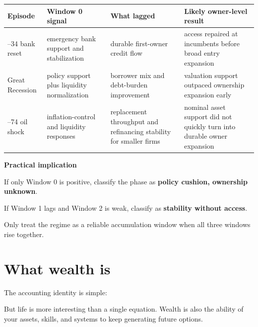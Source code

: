 \documentclass[11pt,openany]{book}
\begin{document}
\begin{center}
\small
\begin{tabularx}{\textwidth}{>{\raggedright\arraybackslash}p{}>{\raggedright\arraybackslash}p{}>{\raggedright\arraybackslash}p{}>{\raggedright\arraybackslash}p{}}
\toprule
\textbf{Episode} & \textbf{Window 0 signal} & \textbf{What lagged} & \textbf{Likely owner-level result} \\
\midrule
1933--34 bank reset & emergency bank support and stabilization & durable first-owner credit flow & access repaired at incumbents before broad entry expansion \\
Great Recession & policy support plus liquidity normalization & borrower mix and debt-burden improvement & valuation support outpaced ownership expansion early \\
1973--74 oil shock & inflation-control and liquidity responses & replacement throughput and refinancing stability for smaller firms & nominal asset support did not quickly turn into durable owner expansion \\
\bottomrule
\end{tabularx}
\normalsize
\end{center}

\begin{notebox}
\textbf{Practical implication}\par
If only Window 0 is positive, classify the phase as \textbf{policy cushion, ownership unknown}.\par
If Window 1 lags and Window 2 is weak, classify as \textbf{stability without access}.\par
Only treat the regime as a reliable accumulation window when all three windows rise together.
\end{notebox}

\chapter{What wealth is}

The accounting identity is simple:

\begin{center}
\end{center}

But life is more interesting than a single equation. Wealth is also the ability of your assets, skills, and systems to keep generating future options.
\end{document}
